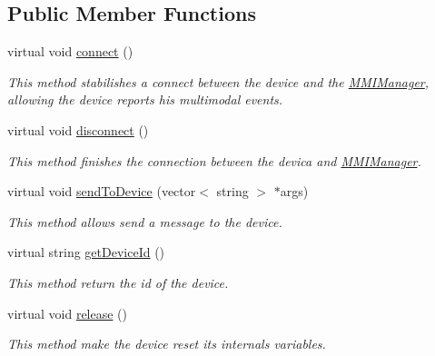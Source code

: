 \subsection*{Public Member Functions}
\begin{DoxyCompactItemize}
\item 
virtual void \hyperlink{classbr_1_1ufscar_1_1lince_1_1mmi_1_1zeroconf_1_1CommunicationManager_a580a75f652a1b1e233b6075f740555e1}{connect} ()
\begin{DoxyCompactList}\small\item\em This method stabilishes a connect between the device and the \hyperlink{classbr_1_1ufscar_1_1lince_1_1mmi_1_1MMIManager}{MMIManager}, allowing the device reports his multimodal events. \item\end{DoxyCompactList}\item 
virtual void \hyperlink{classbr_1_1ufscar_1_1lince_1_1mmi_1_1zeroconf_1_1CommunicationManager_a1c41c5541bf5c02b78f3dc10a045c7f6}{disconnect} ()
\begin{DoxyCompactList}\small\item\em This method finishes the connection between the devica and \hyperlink{classbr_1_1ufscar_1_1lince_1_1mmi_1_1MMIManager}{MMIManager}. \item\end{DoxyCompactList}\item 
virtual void \hyperlink{classbr_1_1ufscar_1_1lince_1_1mmi_1_1zeroconf_1_1CommunicationManager_a40b30969966a6517d21cf9a1cf5c3da8}{sendToDevice} (vector$<$ string $>$ $\ast$args)
\begin{DoxyCompactList}\small\item\em This method allows send a message to the device. \item\end{DoxyCompactList}\item 
virtual string \hyperlink{classbr_1_1ufscar_1_1lince_1_1mmi_1_1zeroconf_1_1CommunicationManager_ac81ba73dafe9e2ca558fad5d46f09e8c}{getDeviceId} ()
\begin{DoxyCompactList}\small\item\em This method return the id of the device. \item\end{DoxyCompactList}\item 
virtual void \hyperlink{classbr_1_1ufscar_1_1lince_1_1mmi_1_1zeroconf_1_1CommunicationManager_aef7bfab9cd63ab8e75fb0782e019574b}{release} ()
\begin{DoxyCompactList}\small\item\em This method make the device reset its internals variables. \item\end{DoxyCompactList}\item 

\end{DoxyCompactItemize}

